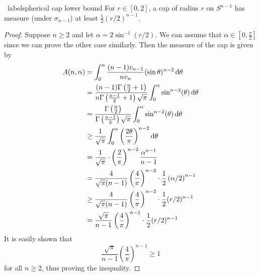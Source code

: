 \begin{lemma}
\   label{spherical cap lower bound}
    For $r\in[0,2]$, a cap of radius $r$ on $S^{n-1}$ has measure (under $\sigma_{n-1}$) at least $\frac{1}{2}(r/2)^{n-1}$.
\end{lemma}
\begin{proof}
    Suppose $n\geq 2$ and let $\alpha =2\sin^{-1}(r/2)$. We can assume that $\alpha\in [0,\frac{\pi}{2}]$ since we can prove the other case similarly. Then the measure of the cap is given by
    \begin{align*}
        A(n,\alpha) &= \int_0^\alpha \frac{(n-1)v_{n-1}}{nv_n} (\sin\theta)^{n-2}\operatorname{d}\!{\theta}\\
            &= \frac{(n-1)\Gamma\left(\frac{n}{2}+1\right)}{n\Gamma\left(\frac{n-1}{2}+1\right)\sqrt{\pi}}\int_0^\alpha \sin^{n-2}(\theta)\operatorname{d}\!{\theta} \\
            &= \frac{\Gamma\left(\frac{n}{2}\right)}{\Gamma\left(\frac{n-1}{2}\right)\sqrt{\pi}}\int_0^\alpha \sin^{n-2}(\theta)\operatorname{d}\!{\theta} \\
            &\geq \frac{1}{\sqrt{\pi}}\int_0^\alpha \left(\frac{2\theta}{\pi}\right)^{n-2} \operatorname{d}\!{\theta} \\
            &= \frac{1}{\sqrt{\pi}}\cdot \left(\frac{2}{\pi}\right)^{n-2}\frac{\alpha^{n-1}}{n-1} \\
            &= \frac{4}{\sqrt{\pi}(n-1)} \left(\frac{4}{\pi}\right)^{n-2}\cdot \frac{1}{2}\left(\alpha/2\right)^{n-1} \\
            &\geq \frac{4}{\sqrt{\pi}(n-1)} \left(\frac{4}{\pi}\right)^{n-2}\cdot \frac{1}{2}(r/2)^{n-1} \\
            &= \frac{\sqrt{\pi}}{n-1} \left(\frac{4}{\pi}\right)^{n-1}\cdot \frac{1}{2}(r/2)^{n-1}
    \end{align*}
    It is easily shown that
    \[ \frac{\sqrt{\pi}}{n-1} \left(\frac{4}{\pi}\right)^{n-1} \geq 1\]
    for all $n\geq 2$, thus proving the inequality.
\end{proof}


